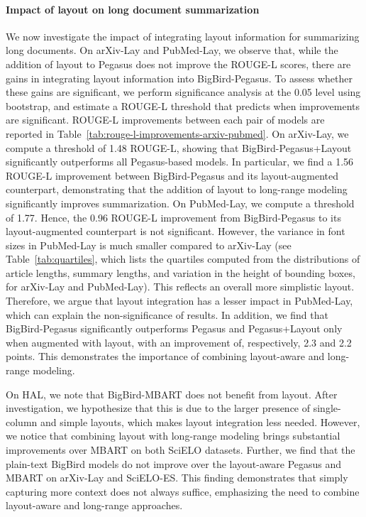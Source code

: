 \paragraph{Impact of layout on long document summarization} We now investigate the impact of integrating layout information for summarizing long documents. On arXiv-Lay and PubMed-Lay, we observe that, while the addition of layout to Pegasus does not improve the ROUGE-L scores, there are gains in integrating layout information into BigBird-Pegasus. To assess whether these gains are significant, we perform significance analysis at the 0.05 level using bootstrap, and estimate a ROUGE-L threshold that predicts when improvements are significant. ROUGE-L improvements between each pair of models are reported in Table~\ref{tab:rouge-l-improvements-arxiv-pubmed}. On arXiv-Lay, we compute a threshold of 1.48 ROUGE-L, showing that BigBird-Pegasus+Layout significantly outperforms all Pegasus-based models. In particular, we find a 1.56 ROUGE-L improvement between BigBird-Pegasus and its layout-augmented counterpart, demonstrating that the addition of layout to long-range modeling significantly improves summarization. On PubMed-Lay, we compute a threshold of 1.77. Hence, the 0.96 ROUGE-L improvement from BigBird-Pegasus to its layout-augmented counterpart is not significant. However, the variance in font sizes in PubMed-Lay is much smaller compared to arXiv-Lay (see Table~\ref{tab:quartiles}, which lists the quartiles computed from the distributions of article lengths, summary lengths, and variation in the height of bounding boxes, for arXiv-Lay and PubMed-Lay). This reflects an overall more simplistic layout. Therefore, we argue that layout integration has a lesser impact in PubMed-Lay, which can explain the non-significance of results. In addition, we find that BigBird-Pegasus significantly outperforms Pegasus and Pegasus+Layout only when augmented with layout, with an improvement of, respectively, 2.3 and 2.2 points. This demonstrates the importance of combining layout-aware and long-range modeling. 

On HAL, we note that BigBird-MBART does not benefit from layout. After investigation, we hypothesize that this is due to the larger presence of single-column and simple layouts, which makes layout integration less needed. However, we notice that combining layout with long-range modeling brings substantial improvements over MBART on both SciELO datasets. Further, we find that the plain-text BigBird models do not improve over the layout-aware Pegasus and MBART on arXiv-Lay and SciELO-ES. This finding demonstrates that simply capturing more context does not always suffice, emphasizing the need to combine layout-aware and long-range approaches. 

